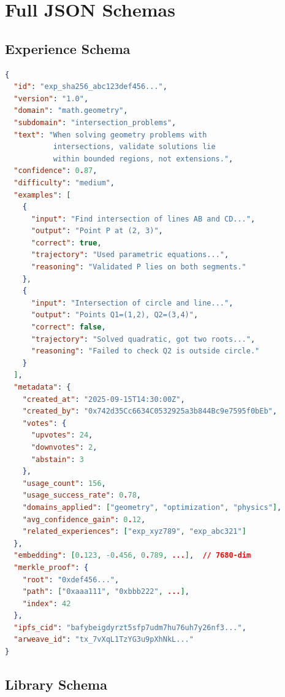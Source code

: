 \section{Full JSON Schemas}


\subsection{Experience Schema}

\begin{lstlisting}[language=json,caption=Complete Experience JSON]
{
  "id": "exp_sha256_abc123def456...",
  "version": "1.0",
  "domain": "math.geometry",
  "subdomain": "intersection_problems",
  "text": "When solving geometry problems with 
           intersections, validate solutions lie 
           within bounded regions, not extensions.",
  "confidence": 0.87,
  "difficulty": "medium",
  "examples": [
    {
      "input": "Find intersection of lines AB and CD...",
      "output": "Point P at (2, 3)",
      "correct": true,
      "trajectory": "Used parametric equations...",
      "reasoning": "Validated P lies on both segments."
    },
    {
      "input": "Intersection of circle and line...",
      "output": "Points Q1=(1,2), Q2=(3,4)",
      "correct": false,
      "trajectory": "Solved quadratic, got two roots...",
      "reasoning": "Failed to check Q2 is outside circle."
    }
  ],
  "metadata": {
    "created_at": "2025-09-15T14:30:00Z",
    "created_by": "0x742d35Cc6634C0532925a3b844Bc9e7595f0bEb",
    "votes": {
      "upvotes": 24,
      "downvotes": 2,
      "abstain": 3
    },
    "usage_count": 156,
    "usage_success_rate": 0.78,
    "domains_applied": ["geometry", "optimization", "physics"],
    "avg_confidence_gain": 0.12,
    "related_experiences": ["exp_xyz789", "exp_abc321"]
  },
  "embedding": [0.123, -0.456, 0.789, ...],  // 7680-dim
  "merkle_proof": {
    "root": "0xdef456...",
    "path": ["0xaaa111", "0xbbb222", ...],
    "index": 42
  },
  "ipfs_cid": "bafybeigdyrzt5sfp7udm7hu76uh7y26nf3...",
  "arweave_id": "tx_7vXqL1TzYG3u9pXhNkL..."
}
\end{lstlisting}

\subsection{Library Schema}

